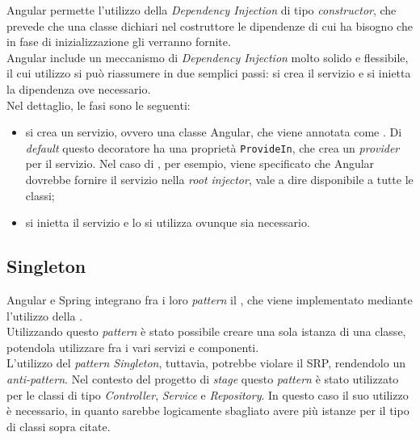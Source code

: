
\noindent Angular permette l'utilizzo della \textit{Dependency Injection} di
tipo \textit{constructor}, che prevede che una classe dichiari nel costruttore
le dipendenze di cui ha bisogno che in fase di inizializzazione gli verranno
fornite.\\
Angular include un meccanismo di \textit{Dependency Injection} molto solido e
flessibile, il cui utilizzo si può riassumere in due semplici passi: si
crea il servizio e si inietta la dipendenza ove necessario.\\
Nel dettaglio, le fasi sono le seguenti:
\begin{itemize}
    \item si crea un servizio, ovvero una classe Angular, che viene annotata
          come . Di \textit{default} questo decoratore ha
          una
          proprietà \texttt{ProvideIn}, che crea un \textit{provider} per il
          servizio.
          Nel caso di , per esempio, viene specificato
          che
          Angular dovrebbe fornire il servizio nella \textit{root injector},
          vale a dire
          disponibile a tutte le classi;
          
    \item  si inietta il servizio e lo si utilizza ovunque sia necessario.
          \cite{site-dependency-injection-angular}
          
\end{itemize}
\subsection{Singleton}
\label{sub:Singleton}
Angular e Spring integrano fra i loro \textit{pattern} il ,
che viene implementato mediante l'utilizzo della
.\\
Utilizzando questo \textit{pattern} è stato possibile creare una sola istanza
di una classe, potendola utilizzare fra i vari servizi e componenti.\\
L'utilizzo del \textit{pattern Singleton}, tuttavia, potrebbe violare il
\gls{SRP}, rendendolo un \textit{anti-pattern}. Nel contesto del progetto di
\textit{stage} questo \textit{pattern} è stato utilizzato per le classi di
tipo \textit{Controller}, \textit{Service} e \textit{Repository}. In questo
caso il suo utilizzo è necessario, in quanto sarebbe logicamente sbagliato
avere
più istanze per il tipo di classi sopra citate. \cite{site-singleton}

